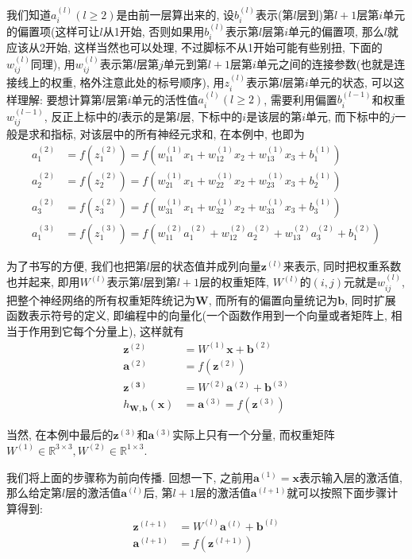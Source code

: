 \documentclass[a4paper,UTF8]{ctexart}
\theoremstyle{plain} \newtheorem{theorem}{定理}[section]
\theoremstyle{plain} \newtheorem{definition}{定义}[section]
\theoremstyle{plain} \newtheorem{lemma}{引理}[section]
\theoremstyle{plain} \newtheorem{proposition}{命题}[section]
\theoremstyle{plain} \newtheorem{example}{例}[section]
\theoremstyle{plain} \newtheorem{remark}{注}[section]
\theoremstyle{plain} \newtheorem{corollary}{推论}[section]
\begin{document}
我们知道$a_{i}^{(l)}(l \geqslant 2)$是由前一层算出来的, 设$b_{i}^{(l)}$表示(第$l$层到)第$l + 1$层第$i$单元的偏置项(这样可让$l$从1开始, 否则如果用$b_{i}^{(l)}$表示第$l$层第$i$单元的偏置项, 那么$l$就应该从2开始, 这样当然也可以处理, 不过脚标不从1开始可能有些别扭, 下面的$w_{ij}^{(l)}$同理), 用$w_{ij}^{(l)}$表示第$l$层第$j$单元到第$l + 1$层第$i$单元之间的连接参数(也就是连接线上的权重, 格外注意此处的标号顺序), 用$z_{i}^{(l)}$表示第$l$层第$i$单元的状态, 可以这样理解: 要想计算第$l$层第$i$单元的活性值$a_{i}^{(l)}(l \geqslant 2)$, 需要利用偏置$b_{i}^{(l - 1)}$和权重$w_{ij}^{(l - 1)}$, 反正上标中的$l$表示的是第$l$层, 下标中的$i$是该层的第$i$单元, 而下标中的$j$一般是求和指标, 对该层中的所有神经元求和, 在本例中, 也即为
\begin{align*}
a_{1}^{(2)} & = f(z_{1}^{(2)}) = f(w_{11}^{(1)} x_1 + w_{12}^{(1)} x_2 + w_{13}^{(1)} x_3 + b_{1}^{(1)}) \\ 
a_{2}^{(2)} & = f(z_{2}^{(2)}) = f(w_{21}^{(1)} x_1 + w_{22}^{(1)} x_2 + w_{23}^{(1)} x_3 + b_{2}^{(1)}) \\ 
a_{3}^{(2)} & = f(z_{3}^{(2)}) = f(w_{31}^{(1)} x_1 + w_{32}^{(1)} x_2 + w_{33}^{(1)} x_3 + b_{3}^{(1)}) \\ 
a_{1}^{(3)} & = f(z_{1}^{(3)}) = f(w_{11}^{(2)} a_{1}^{(2)} + w_{12}^{(2)} a_{2}^{(2)} + w_{13}^{(2)} a_{3}^{(2)} + b_{1}^{(2)})
\end{align*}

为了书写的方便, 我们也把第$l$层的状态值并成列向量$\bm{z}^{(l)}$来表示, 同时把权重系数也并起来, 即用$W^{(l)}$表示第$l$层到第$l + 1$层的权重矩阵, $W^{(l)}$的$(i, j)$元就是$w_{ij}^{(l)}$, 把整个神经网络的所有权重矩阵统记为$\bm{W}$, 而所有的偏置向量统记为$\bm{b}$, 同时扩展函数表示符号的定义, 即编程中的向量化(一个函数作用到一个向量或者矩阵上, 相当于作用到它每个分量上), 这样就有
\begin{align*}
\bm{z}^{(2)} & = W^{(1)} \bm{x} + \bm{b}^{(2)} \\ 
\bm{a}^{(2)} & = f(\bm{z}^{(2)}) \\ 
\bm{z^{(3)}} & = W^{(2)} \bm{a}^{(2)} + \bm{b}^{(3)} \\ 
h_{\bm{W, b}} (\bm{x}) & = \bm{a}^{(3)} = f(\bm{z}^{(3)}) 
\end{align*}

当然, 在本例中最后的$\bm{z}^{(3)}$和$\bm{a}^{(3)}$实际上只有一个分量, 而权重矩阵$W^{(1)} \in \mathbb{R}^{3 \times 3}, W^{(2)} \in \mathbb{R}^{1 \times 3}$.

我们将上面的步骤称为前向传播. 回想一下, 之前用$\bm{a}^{(1)} = \bm{x}$表示输入层的激活值, 那么给定第$l$层的激活值$\bm{a}^{(l)}$后, 第$l + 1$层的激活值$\bm{a}^{(l + 1)}$就可以按照下面步骤计算得到:
\begin{align*}
\bm{z}^{(l + 1)} & = W^{(l)} \bm{a}^{(l)} + \bm{b}^{(l)} \\ 
\bm{a}^{(l + 1)} & = f(\bm{z}^{(l + 1)})
\end{align*}
\end{document}
